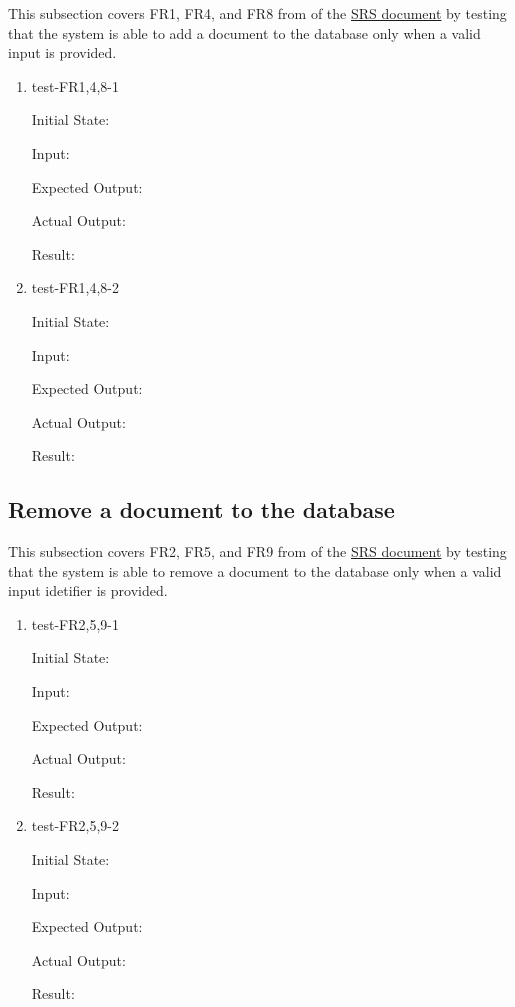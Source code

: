\documentclass[12pt, titlepage]{article}
\begin{document}
This subsection covers FR1, FR4, and FR8 from of the \href{https://github.com/Inreet-Kaur/capstone/blob/main/docs/SRS/SRS.pdf}{SRS document} by testing that the system is able to add a document to the database only when a valid input is provided.

\begin{enumerate}

  \item{test-FR1,4,8-1} \label{test-FR1,4,8-1}
  
  Initial State:

  Input:

  Expected Output:

  Actual Output:

  Result:


  \item{test-FR1,4,8-2} \label{test-FR1,4,8-2}

  Initial State:

  Input:

  Expected Output:

  Actual Output:

  Result:

\end{enumerate}

\subsection{Remove a document to the database} \label{section:3.2}

This subsection covers FR2, FR5, and FR9 from of the \href{https://github.com/Inreet-Kaur/capstone/blob/main/docs/SRS/SRS.pdf}{SRS document} by testing that the system is able to remove a document to the database only when a valid input idetifier is provided.

\begin{enumerate}

  \item{test-FR2,5,9-1} \label{test-FR2,5,9-1}
  
  Initial State:

  Input:

  Expected Output:

  Actual Output:

  Result:


  \item{test-FR2,5,9-2} \label{test-FR2,5,9-2}

  Initial State:

  Input:

  Expected Output:

  Actual Output:

  Result:

\end{enumerate}
\end{document}

